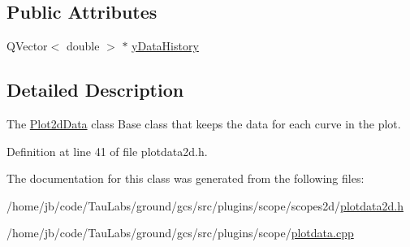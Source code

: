 \subsection*{\-Public \-Attributes}
\begin{DoxyCompactItemize}
\item 
\-Q\-Vector$<$ double $>$ $\ast$ \hyperlink{group___scope_plugin_ga3f05450290135f9d3b69ab0119718f11}{y\-Data\-History}
\end{DoxyCompactItemize}


\subsection{\-Detailed \-Description}
\-The \hyperlink{class_plot2d_data}{\-Plot2d\-Data} class \-Base class that keeps the data for each curve in the plot. 

\-Definition at line 41 of file plotdata2d.\-h.



\-The documentation for this class was generated from the following files\-:\begin{DoxyCompactItemize}
\item 
/home/jb/code/\-Tau\-Labs/ground/gcs/src/plugins/scope/scopes2d/\hyperlink{plotdata2d_8h}{plotdata2d.\-h}\item 
/home/jb/code/\-Tau\-Labs/ground/gcs/src/plugins/scope/\hyperlink{plotdata_8cpp}{plotdata.\-cpp}\end{DoxyCompactItemize}
